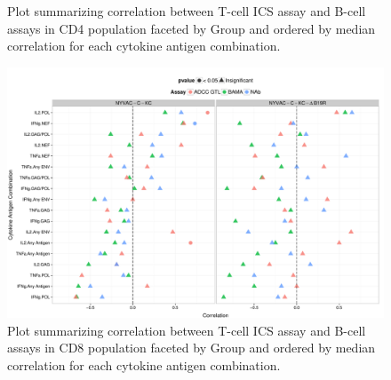 \documentclass[11pt]{article}\usepackage[]{graphicx}\usepackage[]{color}
\makeatletter
\def\maxwidth{ %
  \ifdim\Gin@nat@width>\linewidth
    \linewidth
  \else
    \Gin@nat@width
  \fi
}
\newenvironment{knitrout}{}{} %
\makeatother
\begin{document}
\begin{landscape}
\begin{figure}[H]
\begin{center}
\begin{knitrout}
\end{knitrout}
\caption{Plot summarizing correlation between T-cell ICS assay and B-cell assays in CD4 population faceted by Group and ordered by median correlation for each cytokine antigen combination.}
\end{center}
\end{figure}


\begin{figure}[H]
\begin{center}
\begin{knitrout}
\color{fgcolor}
\includegraphics[width=\maxwidth]{figure/corrplot_CD8-1} 

\end{knitrout}
\caption{Plot summarizing correlation between T-cell ICS assay and B-cell assays in CD8 population faceted by Group and ordered by median correlation for each cytokine antigen combination.}
\end{center}
\end{figure}





\end{landscape}
\end{document}
